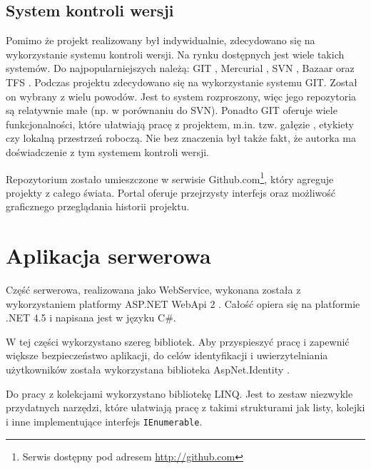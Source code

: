 \documentclass{book}
\begin{document}
			\subsection{System kontroli wersji}
			
			Pomimo że projekt realizowany był indywidualnie, zdecydowano się na wykorzystanie systemu kontroli wersji. Na rynku dostępnych jest wiele takich systemów. Do najpopularniejszych należą: GIT \cite{id:GIT}, Mercurial \cite{id:Mecurial}, SVN \cite{id:SVN}, Bazaar \cite{id:Bazaar} oraz TFS \cite{id:TFS}.
			Podczas projektu zdecydowano się na wykorzystanie systemu GIT. Został on wybrany z wielu powodów. Jest to system rozproszony, więc jego repozytoria są relatywnie małe (np. w porównaniu do SVN). Ponadto GIT oferuje wiele funkcjonalności, które ułatwiają pracę z projektem, m.in. tzw. gałęzie , etykiety czy lokalną przestrzeń roboczą. Nie bez znaczenia był także fakt, że autorka ma doświadczenie z tym systemem kontroli wersji.

			Repozytorium zostało umieszczone w serwisie Github.com\footnote{Serwis dostępny pod adresem \url{http://github.com}}, który agreguje projekty z całego świata. Portal oferuje przejrzysty interfejs oraz możliwość graficznego przeglądania historii projektu.
		
		\section{Aplikacja serwerowa}
		
		Część serwerowa, realizowana jako WebService, wykonana została z wykorzystaniem platformy ASP.NET WebApi 2 \cite{id:WebApi}. Całość opiera się na platformie .NET 4.5 i napisana jest w języku C\#.
		
		W tej części wykorzystano szereg bibliotek. Aby przyspieszyć pracę i zapewnić większe bezpieczeństwo aplikacji, do celów identyfikacji i uwierzytelniania użytkowników została wykorzystana biblioteka AspNet.Identity \cite{id:ASPIdentity}.
		
		Do pracy z kolekcjami wykorzystano bibliotekę LINQ. Jest to zestaw niezwykle przydatnych narzędzi, które ułatwiają pracę z takimi strukturami jak listy, kolejki i inne implementujące interfejs \texttt{IEnumerable}.
		
\end{document}
